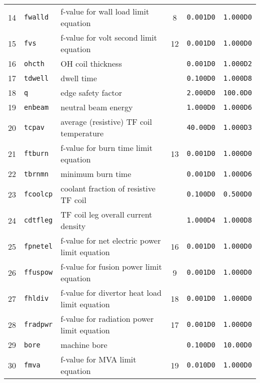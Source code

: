 \documentclass[11pt,a4paper]{report}
\begin{document}
\begin{table}[tbph]
\begin{center}
\begin{tabular}{||c|l|l|c|c|c||}
14  & \texttt{fwalld}   & f-value for wall load limit equation          & 8   & \texttt{0.001D0} & \texttt{1.000D0} \\
15  & \texttt{fvs}      & f-value for volt second limit equation        & 12  & \texttt{0.001D0} & \texttt{1.000D0} \\
16  & \texttt{ohcth}    & OH coil thickness                             &     & \texttt{0.001D0} & \texttt{1.000D2} \\
17  & \texttt{tdwell}   & dwell time                                    &     & \texttt{0.100D0} & \texttt{1.000D8} \\
18  & \texttt{q}        & edge safety factor                            &     & \texttt{2.000D0} & \texttt{100.0D0} \\
19  & \texttt{enbeam}   & neutral beam energy                           &     & \texttt{1.000D0} & \texttt{1.000D6} \\
20  & \texttt{tcpav}    & average (resistive) TF coil temperature       &     & \texttt{40.00D0} & \texttt{1.000D3} \\
21  & \texttt{ftburn}   & f-value for burn time limit equation          & 13  & \texttt{0.001D0} & \texttt{1.000D0} \\
22  & \texttt{tbrnmn}   & minimum burn time                             &     & \texttt{0.001D0} & \texttt{1.000D6} \\
23  & \texttt{fcoolcp}  & coolant fraction of resistive TF coil         &     & \texttt{0.100D0} & \texttt{0.500D0} \\
24  & \texttt{cdtfleg}  & TF coil leg overall current density           &     & \texttt{1.000D4} & \texttt{1.000D8} \\
25  & \texttt{fpnetel}  & f-value for net electric power limit equation & 16  & \texttt{0.001D0} & \texttt{1.000D0} \\
26  & \texttt{ffuspow}  & f-value for fusion power limit equation       & 9   & \texttt{0.001D0} & \texttt{1.000D0} \\
27  & \texttt{fhldiv}   & f-value for divertor heat load limit equation & 18  & \texttt{0.001D0} & \texttt{1.000D0} \\
28  & \texttt{fradpwr}  & f-value for radiation power limit equation    & 17  & \texttt{0.001D0} & \texttt{1.000D0} \\
29  & \texttt{bore}     & machine bore                                  &     & \texttt{0.100D0} & \texttt{10.00D0} \\
30  & \texttt{fmva}     & f-value for MVA limit equation                & 19  & \texttt{0.010D0} & \texttt{1.000D0} \\

\end{tabular}
\end{center}
\end{table}
\end{document}
